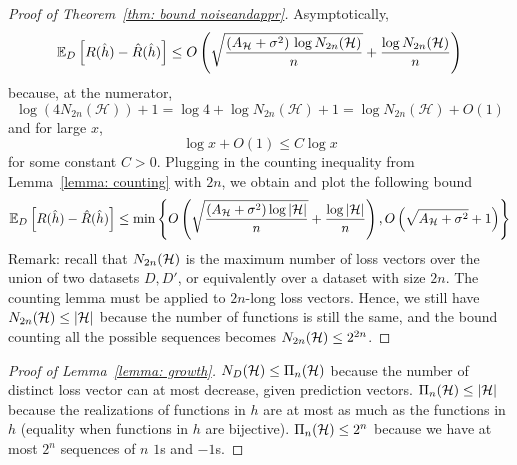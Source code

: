 \documentclass[reqno]{amsart}
\begin{document}
\begin{proof}[Proof of Theorem~\ref{thm: bound noiseandappr}]
Asymptotically,
\[
\mathbb{E}_D\left[R(\hat h)-\hat R(\hat h)\right] \le O\left(
\sqrt{\frac{(A_{\mathcal H}+\sigma^2)\,\log N_{2n}(\mathcal H)}{n}} + \frac{\log N_{2n}(\mathcal H)}{n} \right)
\]
because, at the numerator,
\[
\log (4 N_{2n}(\mathcal H)) + 1 = \log 4 + \log N_{2n}(\mathcal H) + 1 = \log N_{2n}(\mathcal H) + O(1)
\]
and for large $x$, 
\[
\log x + O(1) \le C \log x
\] 
for some constant $C>0$. Plugging in the counting inequality from Lemma~\ref{lemma: counting} with $2n$, we obtain and plot the following bound
\[
\mathbb{E}_D\left[R(\hat h)-\hat R(\hat h)\right] \le \min\left\{ O\left(
\sqrt{\frac{(A_{\mathcal H}+\sigma^2)\log \vert\mathcal{H}\vert}{n}} + \frac{\log\vert\mathcal{H}\vert}{n} \right), O\left(
\sqrt{A_{\mathcal H}+\sigma^2}+1  \right)\right\}
\]
Remark: recall that $N_{2n}(\mathcal{H})$ is the maximum number of loss vectors over the union of two datasets $D, D'$, or equivalently over a dataset with size $2n$. The counting lemma must be applied to $2n$-long loss vectors. Hence, we still have $N_{2n}(\mathcal{H}) \le \vert \mathcal{H}\vert$ because the number of functions is still the same, and the bound counting all the possible sequences becomes $N_{2n}(\mathcal{H}) \le 2^{2n}$. 

\end{proof}

\begin{proof}[Proof of Lemma~\ref{lemma: growth}]
    $N_D(\mathcal{H}) \le \Pi_{n}(\mathcal{H})$ because the number of distinct loss vector can at most decrease, given prediction vectors. $\Pi_{n}(\mathcal{H})\le \vert\mathcal{H}\vert$ because the realizations of functions in $h$ are at most as much as the functions in $h$ (equality when functions in $h$ are bijective). $\Pi_{n}(\mathcal{H})\le 2^n$ because we have at most $2^n$ sequences of $n$ $1$s and $-1$s.
\end{proof}
\end{document}
